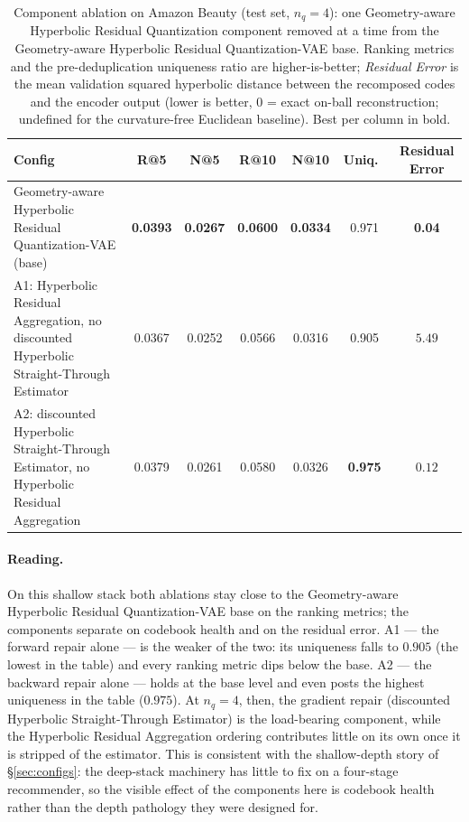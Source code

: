 \documentclass[12pt]{report}
\begin{document}
\begin{table}[h]
\centering
\caption{Component ablation on Amazon Beauty (test set, $n_q=4$): one Geometry-aware Hyperbolic Residual Quantization component removed at a time from the Geometry-aware Hyperbolic Residual Quantization-VAE base. Ranking metrics and the pre-deduplication uniqueness ratio are higher-is-better; \emph{Residual Error} is the mean validation squared hyperbolic distance between the recomposed codes and the encoder output (lower is better, $0$ = exact on-ball reconstruction; undefined for the curvature-free Euclidean baseline). Best per column in bold.}
\label{tab:abl_rec}
\begin{tabular}{lcccccc}
\hline
Config & R@5 & N@5 & R@10 & N@10 & Uniq.\ & Residual Error \\
\hline
Geometry-aware Hyperbolic Residual Quantization-VAE (base)     & \textbf{0.0393} & \textbf{0.0267} & \textbf{0.0600} & \textbf{0.0334} & 0.971 & \textbf{0.04} \\
A1: Hyperbolic Residual Aggregation, no discounted Hyperbolic Straight-Through Estimator   & 0.0367 & 0.0252 & 0.0566 & 0.0316 & 0.905 & $5.49$ \\
A2: discounted Hyperbolic Straight-Through Estimator, no Hyperbolic Residual Aggregation   & 0.0379 & 0.0261 & 0.0580 & 0.0326 & \textbf{0.975} & $0.12$ \\
\hline
\end{tabular}
\end{table}

\paragraph{Reading.} On this shallow stack both ablations stay close to the Geometry-aware Hyperbolic Residual Quantization-VAE base on the ranking metrics; the components separate on codebook health and on the residual error. A1 --- the forward repair alone --- is the weaker of the two: its uniqueness falls to $0.905$ (the lowest in the table) and every ranking metric dips below the base. A2 --- the backward repair alone --- holds at the base level and even posts the highest uniqueness in the table ($0.975$). At $n_q=4$, then, the gradient repair (discounted Hyperbolic Straight-Through Estimator) is the load-bearing component, while the Hyperbolic Residual Aggregation ordering contributes little on its own once it is stripped of the estimator. This is consistent with the shallow-depth story of \S\ref{sec:configs}: the deep-stack machinery has little to fix on a four-stage recommender, so the visible effect of the components here is codebook health rather than the depth pathology they were designed for.
\end{document}
